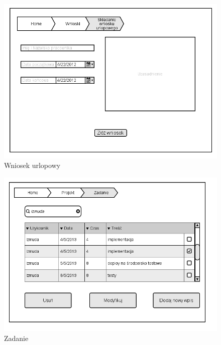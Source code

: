 \begin{figure}[H]
    \centering
    \includegraphics[scale=0.7]{diagramy/intefejsy/Wniosek_urlopowy.png}
    \caption{Wniosek urlopowy}
    \label{fig:usecase}
\end{figure}

\begin{figure}[H]
    \centering
    \includegraphics[scale=0.7]{diagramy/intefejsy/Zadanie.png}
    \caption{Zadanie}
    \label{fig:usecase}
\end{figure}